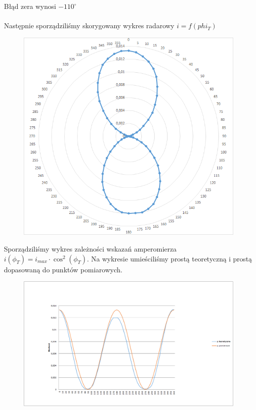 \documentclass{article}
\begin{document}
Błąd zera wynosi $-110^{\circ}$\\\\

Następnie sporządziliśmy skorygowany wykres radarowy $i = f(phi_T)$ 

\begin{figure}
\centering
\includegraphics[width=18cm]{wykres3.png}
\end{figure}

$$$$ \newpage
Sporządziliśmy wykres zależności wskazań amperomierza $i(\phi_T) = i_{max} \cdot \cos^2(\phi_T)$. Na wykresie umieściliśmy prostą teoretyczną i prostą dopasowaną do punktów pomiarowych.

\begin{figure}
\centering
\includegraphics[width=18cm]{wykres4.png}
\end{figure}
\end{document}
